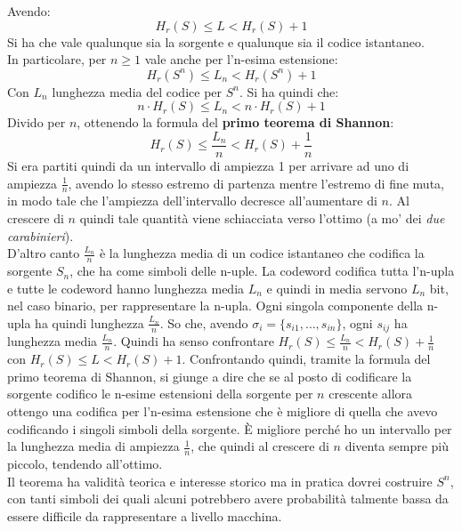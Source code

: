 \documentclass[a4paper,12pt, oneside]{book}
\begin{document}
\begin{teorema}
  Avendo:
  \[H_r(S)\leq L< H_r(S)+1\]
  Si ha che vale qualunque sia la sorgente e qualunque sia il codice
  istantaneo.\\
  In particolare, per $n\geq 1$ vale anche per l'n-esima estensione:
  \[H_r(S^n)\leq L_n< H_r(S^n)+1\]
  Con $L_n$ lunghezza media del codice per $S^n$. Si ha quindi che:
  \[n\cdot H_r(S)\leq L_n< n\cdot H_r(S)+1\]
  Divido per $n$, ottenendo la formula del \textbf{primo teorema di Shannon}:
  \[H_r(S)\leq \frac{L_n}{n}< H_r(S)+\frac{1}{n}\]
  Si era partiti quindi da un intervallo di ampiezza 1 per arrivare ad uno di
  ampiezza $\frac{1}{n}$, avendo lo stesso estremo di partenza mentre l'estremo
  di fine muta, in modo tale che l'ampiezza dell'intervallo decresce
  all'aumentare di $n$.
  Al crescere di $n$ quindi tale quantità viene schiacciata verso l'ottimo (a
  mo' dei 
  \textit{due carabinieri}).\\
  D'altro canto $\frac{L_n}{n}$ è la lunghezza media di un codice istantaneo che
  codifica la sorgente $S_n$, che ha come simboli delle n-uple. La codeword
  codifica tutta l'n-upla e tutte le codeword hanno lunghezza media $L_n$ e
  quindi in media servono $L_n$ bit, nel caso binario, per rappresentare la
  n-upla. Ogni singola componente della n-upla ha quindi lunghezza
  $\frac{L_n}{n}$. 
  So che, avendo $\sigma_i=\{s_{i1},\ldots, s_{in}\}$,
  ogni $s_{ij}$ ha lunghezza media $\frac{L_n}{n}$. Quindi ha senso
  confrontare 
  $H_r(S)\leq \frac{L_n}{n}< H_r(S)+\frac{1}{n}$ con $H_r(S)\leq L<
  H_r(S)+1$. Confrontando quindi, tramite la formula del primo teorema di
  Shannon, si giunge a dire che se al posto di codificare la 
  sorgente codifico le n-esime estensioni della sorgente per $n$ crescente
  allora ottengo una codifica per l'n-esima estensione che è migliore di quella
  che avevo codificando i singoli simboli della sorgente. È migliore perché ho
  un intervallo per la lunghezza media di ampiezza $\frac{1}{n}$, che quindi al
  crescere di $n$ diventa sempre più piccolo, tendendo all'ottimo.\\
  Il teorema ha validità teorica e interesse storico ma in pratica dovrei
  costruire $S^n$, con tanti 
  simboli dei quali alcuni potrebbero avere probabilità talmente bassa da essere
  difficile da rappresentare a livello macchina.
\end{teorema}
\end{document}
